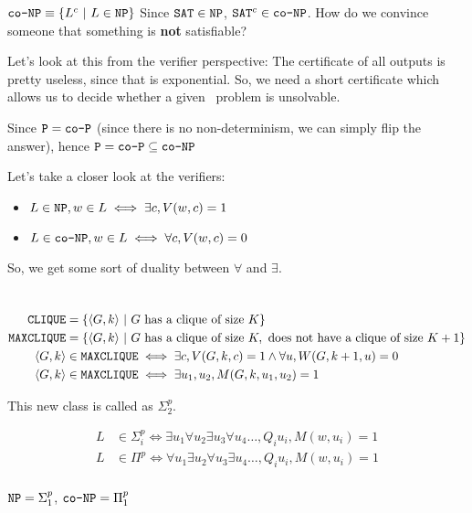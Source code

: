 $\texttt{co-NP} \equiv \{ L^c~\vert~L \in \texttt{NP} \}$
Since $\texttt{SAT} \in \texttt{NP}$, $\texttt{SAT}^c \in \texttt{co-NP}$. How do we convince someone
that something is \textbf{not} satisfiable?

Let's look at this from the verifier perspective: The certificate of all
outputs is pretty useless, since that is exponential. So, we need a
short certificate which allows us to decide whether a given \sat~problem is
unsolvable.

Since $\texttt{P} = \texttt{co-P}$ (since there is no non-determinism, we can simply flip the answer),
hence $\texttt{P} = \texttt{co-P} \subseteq \texttt{co-NP}$


Let's take a closer look at the verifiers:
\begin{itemize}
    \item $L \in \texttt{NP}, w \in L \iff \exists c, V(w, c) = 1$
    \item $L \in \texttt{co-NP}, w \in L \iff \forall c, V(w, c) = 0$
\end{itemize}

So, we get some sort of duality between $\forall$ and $\exists$.

\section{\clique}
\begin{align*}
    \texttt{CLIQUE} &= \{ \langle G, k \rangle~\vert~G~\text{has a clique of size}~K \} \\
    \texttt{MAXCLIQUE} &= \{ \langle G, k \rangle~\vert~G~\text{has a clique of size}~K, \text{ does not have a clique of size } K+1 \}\\
    \langle G, k \rangle &\in \texttt{MAXCLIQUE} \iff \exists c, V(G, k, c) = 1 \land \forall u, W(G, k+1, u) = 0\\
    \langle G, k \rangle &\in \texttt{MAXCLIQUE} \iff \exists u_1, u_2, M(G, k, u_1, u_2) = 1
\end{align*}

This new class is called as $\Sigma_2^p$.


\begin{align*}
    L &\in \Sigma_i^p \iff \exists u_1 \forall u_2 \exists u_3 \forall u_4 \dots, Q_i u_i, M(w, u_i)  = 1 \\
    L &\in \Pi^p \iff \forall u_1 \exists u_2 \forall u_3 \exists u_4 \dots, Q_i u_i, M(w, u_i)  = 1 \\
\end{align*}

$\texttt{NP} = \Sigma^p_1$, $\texttt{co-NP} = \Pi_1^p$

